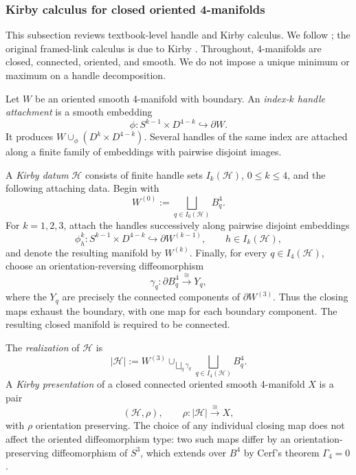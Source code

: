 \subsubsection{Kirby calculus for closed oriented 4-manifolds}
\label{subsec:topological-input}

This subsection reviews textbook-level handle and Kirby calculus.  We follow
\cite[Chapters~4 and~5]{GompfStipsicz1999}; the original framed-link calculus
is due to Kirby \cite{Kirby1978}.  Throughout, 4-manifolds are closed,
connected, oriented, and smooth.  We do not impose a unique minimum or
maximum on a handle decomposition.

\begin{definition}
\label{def:handle-attachment}
Let \(W\) be an oriented smooth 4-manifold with boundary.  An
\emph{index-\(k\) handle attachment} is a smooth embedding
\[
  \phi\colon S^{k-1}\times D^{4-k}\hookrightarrow\partial W.
\]
It produces \(W\cup_{\phi}(D^k\times D^{4-k})\).  Several handles of the
same index are attached along a finite family of embeddings with pairwise
disjoint images.
\end{definition}

\begin{definition}
\label{def:kirby-datum}
A \emph{Kirby datum} \(\mathcal H\) consists of finite handle sets
\(I_k(\mathcal H)\), \(0\leq k\leq4\), and the following attaching data.
Begin with
\[
  W^{(0)}:=\bigsqcup_{q\in I_0(\mathcal H)}B_q^4.
\]
For \(k=1,2,3\), attach the handles successively along pairwise disjoint
embeddings
\[
  \phi_h^k\colon S^{k-1}\times D^{4-k}
  \hookrightarrow\partial W^{(k-1)},
  \qquad h\in I_k(\mathcal H),
\]
and denote the resulting manifold by \(W^{(k)}\).  Finally, for every
\(q\in I_4(\mathcal H)\), choose an orientation-reversing diffeomorphism
\[
  \gamma_q\colon \partial B_q^4\xrightarrow{\ \cong\ }Y_q,
\]
where the \(Y_q\) are precisely the connected components of
\(\partial W^{(3)}\).  Thus the closing maps exhaust the boundary, with one
map for each boundary component.  The resulting closed manifold is required
to be connected.
\end{definition}

\begin{definition}
\label{def:kirby-presentation}
The \emph{realization} of \(\mathcal H\) is
\[
  |\mathcal H|:=W^{(3)}\cup_{\bigsqcup_q\gamma_q}
    \bigsqcup_{q\in I_4(\mathcal H)}B_q^4.
\]
A \emph{Kirby presentation} of a closed connected oriented smooth
4-manifold \(X\) is a pair
\[
  (\mathcal H,\rho),\qquad
  \rho\colon|\mathcal H|\xrightarrow{\ \cong\ }X,
\]
with \(\rho\) orientation preserving.  The choice of any individual closing
map does not affect the oriented diffeomorphism type: two such maps differ by
an orientation-preserving diffeomorphism of \(S^3\), which extends over
\(B^4\) by Cerf's theorem \(\Gamma_4=0\) \cite{Cerf1968}.
\end{definition}

